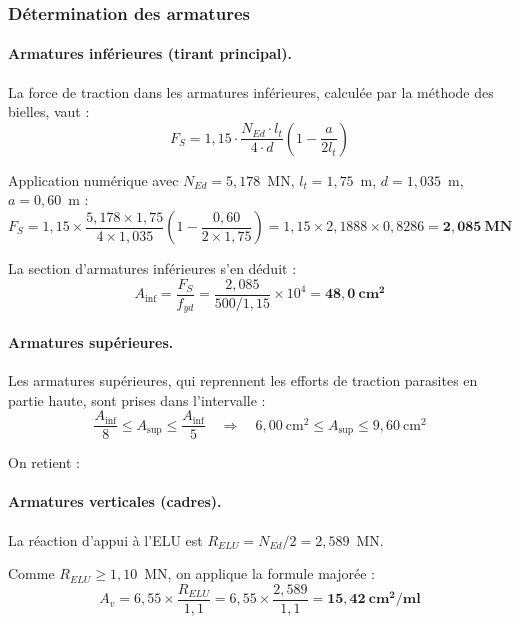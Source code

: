 
\subsubsection{Détermination des armatures}

\paragraph{Armatures inférieures (tirant principal).}
La force de traction dans les armatures inférieures, calculée par la méthode des bielles, vaut :
\[
  F_S = 1{,}15 \cdot \frac{N_{Ed} \cdot l_t}{4 \cdot d}\left(1 - \frac{a}{2 l_t}\right)
\]

Application numérique avec $N_{Ed} = 5{,}178$~MN, $l_t = 1{,}75$~m, $d = 1{,}035$~m, $a = 0{,}60$~m :
\[
  F_S = 1{,}15 \times \frac{5{,}178 \times 1{,}75}{4 \times 1{,}035}\left(1 - \frac{0{,}60}{2 \times 1{,}75}\right)
      = 1{,}15 \times 2{,}1888 \times 0{,}8286
      = \mathbf{2{,}085~\text{MN}}
\]

La section d'armatures inférieures s'en déduit :
\[
  A_\text{inf} = \frac{F_S}{f_{yd}} = \frac{2{,}085}{500/1{,}15} \times 10^{4}
              = \mathbf{48{,}0~\text{cm}^2}
\]

\paragraph{Armatures supérieures.}
Les armatures supérieures, qui reprennent les efforts de traction parasites en partie haute, sont prises dans l'intervalle :
\[
  \frac{A_\text{inf}}{8} \leq A_\text{sup} \leq \frac{A_\text{inf}}{5}
  \quad\Longrightarrow\quad
  6{,}00~\text{cm}^2 \leq A_\text{sup} \leq 9{,}60~\text{cm}^2
\]

On retient :

\paragraph{Armatures verticales (cadres).}
La réaction d'appui à l'ELU est $R_{ELU} = N_{Ed}/2 = 2{,}589$~MN.

Comme $R_{ELU} \geq 1{,}10$~MN, on applique la formule majorée :
\[
  A_v = 6{,}55 \times \frac{R_{ELU}}{1{,}1}
      = 6{,}55 \times \frac{2{,}589}{1{,}1}
      = \mathbf{15{,}42~\text{cm}^2/\text{ml}}
\]


